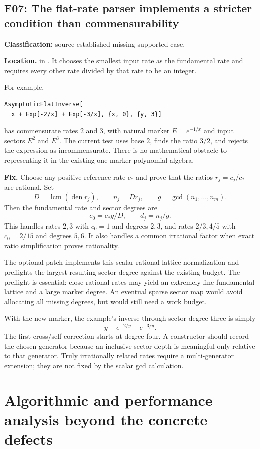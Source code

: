 \documentclass[11pt,letterpaper]{article}
\newcommand{\code}[1]{\texttt{\small\detokenize{#1}}}
\newcommand{\finding}[3]{\Needspace{8\baselineskip}\subsection{#1: #2}\noindent\textbf{Classification:} #3.\par}
\begin{document}
\finding{F07}{The flat-rate parser implements a stricter condition than commensurability}{source-established missing supported case}
\label{sec:f07}
\textbf{Location.} \code{flatModel} in \code{FlatSectors.wl}. It chooses the smallest input rate as the fundamental rate and requires every other rate divided by that rate to be an integer.\cite{repo-flat}

For example,
\begin{lstlisting}
AsymptoticFlatInverse[
  x + Exp[-2/x] + Exp[-3/x], {x, 0}, {y, 3}]
\end{lstlisting}
has commensurate rates $2$ and $3$, with natural marker $E=e^{-1/x}$ and input sectors $E^2$ and $E^3$. The current test uses base $2$, finds the ratio $3/2$, and rejects the expression as incommensurate. There is no mathematical obstacle to representing it in the existing one-marker polynomial algebra.

\textbf{Fix.} Choose any positive reference rate $c_*$ and prove that the ratios $r_j=c_j/c_*$ are rational. Set
\[
 D=\operatorname{lcm}(\operatorname{den}r_j),\qquad
 n_j=Dr_j,\qquad g=\gcd(n_1,\ldots,n_m).
\]
Then the fundamental rate and sector degrees are
\begin{equation}
 c_0=c_*g/D,\qquad d_j=n_j/g.
 \label{eq:flatgcd}
\end{equation}
This handles rates $2,3$ with $c_0=1$ and degrees $2,3$, and rates $2/3,4/5$ with $c_0=2/15$ and degrees $5,6$. It also handles a common irrational factor when exact ratio simplification proves rationality.

The optional patch implements this scalar rational-lattice normalization and preflights the largest resulting sector degree against the existing budget. The preflight is essential: close rational rates may yield an extremely fine fundamental lattice and a large marker degree. An eventual sparse sector map would avoid allocating all missing degrees, but would still need a work budget.

With the new marker, the example's inverse through sector degree three is simply
\[
 y-e^{-2/y}-e^{-3/y}.
\]
The first cross/self-correction starts at degree four. A constructor should record the chosen generator because an inclusive sector depth is meaningful only relative to that generator. Truly irrationally related rates require a multi-generator extension; they are not fixed by the scalar gcd calculation.

\section{Algorithmic and performance analysis beyond the concrete defects}
\label{sec:performance}
\end{document}
